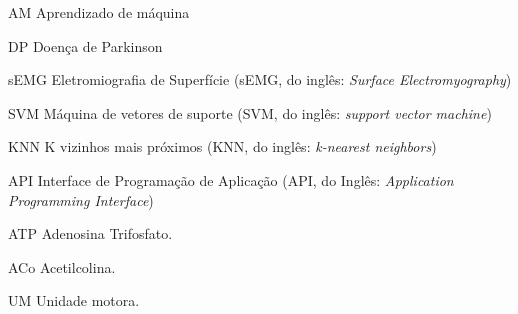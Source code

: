 \begin{siglas}
  \item[AM] Aprendizado de máquina
  \item[DP] Doença de Parkinson
  \item[sEMG] Eletromiografia de Superfície (sEMG, do inglês: \textit{Surface Electromyography})
  \item[SVM] Máquina de vetores de suporte (SVM, do inglês: \textit{support vector machine}) 
  \item[KNN] K vizinhos mais próximos (KNN, do inglês: \textit{k-nearest neighbors}) 
  \item[API] Interface de Programação de Aplicação (API, do Inglês: \textit{Application Programming Interface})
  \item[ATP] Adenosina Trifosfato.
  \item[ACo] Acetilcolina.
  \item[UM] Unidade motora.
\end{siglas}
